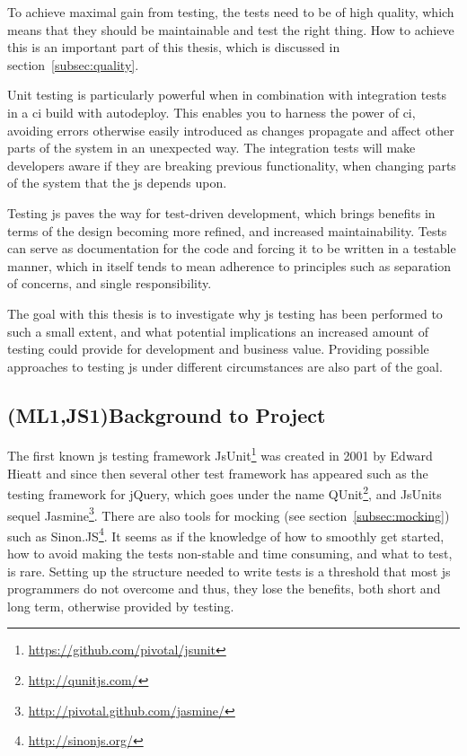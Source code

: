 \documentclass[11pt]{article}
\begin{document}
To achieve maximal gain from testing, the tests need to be of high quality, which means that they should be maintainable and test the right thing. How to achieve this is an important part of this thesis, which is discussed in section~\ref{subsec:quality}.

Unit testing is particularly powerful when in combination with integration tests in a
\gls{ci} build with \gls{autodeploy}.
This enables you to harness the power of \gls{ci}, avoiding errors otherwise easily introduced as changes propagate and affect other parts of the system in an unexpected way. The integration tests will make developers aware if they are breaking previous functionality, when changing parts of the system that the \gls{js} depends upon.

Testing \gls{js} paves the way for test-driven development, which brings benefits in terms of the design becoming more refined, and increased maintainability. Tests can serve as documentation for the code and forcing it to be written in a testable manner, which in itself tends to mean adherence to principles such as separation of concerns, and single responsibility.

The goal with this thesis is to investigate why \gls{js} testing has been performed to such a small extent, and what potential implications an increased amount of testing could provide for development and business value. Providing possible approaches to testing \gls{js} under different circumstances are also part of the goal. %

\subsection{(ML1,JS1)Background to Project}

The first known \gls{js} testing framework JsUnit\footnote{\url{https://github.com/pivotal/jsunit}} was created in 2001 by Edward Hieatt \cite{GoingFaster} and since then several other test framework has appeared such as the testing framework for jQuery, which goes under the name QUnit\footnote{\url{http://qunitjs.com/}}, and JsUnits sequel Jasmine\footnote{\url{http://pivotal.github.com/jasmine/}}. There are also tools for mocking (see section~\ref{subsec:mocking}) such as Sinon.JS\footnote{\url{http://sinonjs.org/}}. It seems as if the knowledge of how to smoothly get started, how to avoid making the tests non-stable and time consuming, and what to test, is rare. Setting up the structure needed to write tests is a threshold that most \gls{js} programmers do not overcome \cite{TestingStatistics} and thus, they lose the benefits, both short and long term, otherwise provided by testing.
\end{document}

